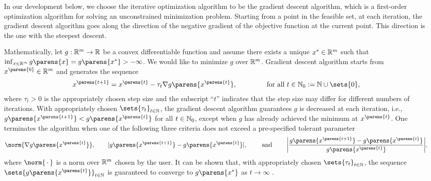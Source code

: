 In our development below, we choose the iterative optimization algorithm to be the gradient descent algorithm, which is a first-order optimization algorithm for solving an unconstrained minimization problem. Starting from a point in the feasible set, at each iteration, the gradient descent algorithm goes along the direction of the negative gradient of the objective function at the current point. This direction is the one with the steepest descent. 

Mathematically, let $g: \mathbb{R}^m \to \mathbb{R}$ be a convex differentiable function and assume there exists a unique $x^* \in \mathbb{R}^m$ such that $\inf_{x \in \Real^m} g \parens{x} = g \parens{x^*} > -\infty$. We would like to minimize $g$ over $\mathbb{R}^m$. Gradient descent algorithm starts from $x^{\parens{0}} \in \Real^m$ and generates the sequence 
\begin{align*}
	x^{\parens{t+1}} = x^{\parens{t}} - \tau_t \nabla g \parens{x^{\parens{t}}}, \qquad \qquad \text{ for all } t \in \Natural_0 := \Natural \cup \sets{0}, 
\end{align*}
where $\tau_t > 0$ is the appropriately chosen step size and the subscript ``$t$'' indicates that the step size may differ for different numbers of iterations. With appropriately chosen $\sets{\tau_t}_{t \in \Natural}$, the gradient descent algorithm guarantees $g$ is decreased at each iteration, i.e., $g \parens{x^{\parens{t+1}}} < g \parens{x^{\parens{t}}}$ for all $t \in \mathbb{N}_0$, except when $g$ has already achieved the minimum at $x^{\parens{t}}$. One terminates the algorithm when one of the following three criteria does not exceed a pre-specified tolerant parameter
\begin{align*}
	\norm{\nabla g \parens{x^{\parens{t}}}}, \qquad 
	\abs{g \parens{x^{\parens{t+1}}} - g \parens{x^{\parens{t}}}}, \qquad \text{ and } \qquad 
	\abs[\bigg]{\frac{g \parens{x^{\parens{t+1}}} - g \parens{x^{\parens{t}}}}{g \parens{x^{\parens{t}}}} }, 
\end{align*}
where $\norm{\,\cdot\,}$ is a norm over $\mathbb{R}^m$ chosen by the user. It can be shown that, with appropriately chosen $\sets{\tau_t}_{t \in \Natural}$, the sequence $\sets{g \parens{x^{\parens{t}}}}_{t \in \Natural}$ is guaranteed to converge to $g \parens{x^*}$ as $t \to \infty$ \parencites[see, for example, Chapter 9 in][]{Boyd2004-gi}. 

